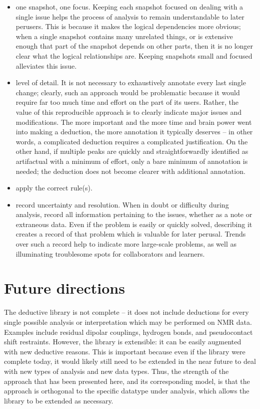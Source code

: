 \begin{itemize}
  \item one snapshot, one focus.  Keeping each snapshot focused on dealing
    with a single issue helps the process of analysis to remain understandable
    to later perusers.  This is because it makes the logical dependencies 
    more obvious; when a single snapshot contains many unrelated things, or
    is extensive enough that part of the snapshot depends on other parts, then
    it is no longer clear what the logical relationships are.  Keeping snapshots
    small and focused alleviates this issue.
  \item level of detail.  It is not necessary to exhaustively annotate every
    last single change; clearly, such an approach would be problematic because
    it would require far too much time and effort on the part of its users.
    Rather, the value of this reproducible approach is to clearly indicate 
    major issues and modifications.  The more important and the more time and
    brain power went into making a deduction, the more annotation it typically
    deserves -- in other words, a complicated deduction requires a complicated
    justification.  On the other hand, if multiple peaks are quickly and
    straightforwardly identified as artifactual with a minimum of effort, 
    only a bare minimum of annotation is needed; the deduction does not become
    clearer with additional annotation.
  \item apply the correct rule(s).
  \item record uncertainty and resolution.  When in doubt or difficulty 
    during analysis, record all information pertaining to the issues, whether
    as a note or extraneous data.  Even if the problem is easily or quickly
    solved, describing it creates a record of that problem which is valuable
    for later perusal.  Trends over such a record help to indicate more 
    large-scale problems, as well as illuminating troublesome spots for
    collaborators and learners.
\end{itemize}
   


\section{Future directions}
The deductive library is not complete -- it does not include deductions for
every single possible analysis or interpretation which may be performed on
NMR data.  Examples include residual dipolar couplings, hydrogen bonds,
and pseudocontact shift restraints.  However, the library is extensible: it
can be easily augmented with new deductive reasons.  This is important because
even if the library were complete today, it would likely still need to be
extended in the near future to deal with new types of analysis and new data
types.  Thus, the strength of the approach that has been presented here, and
its corresponding model, is that the approach is orthogonal to the specific
datatype under analysis, which allows the library to be extended as necessary.

